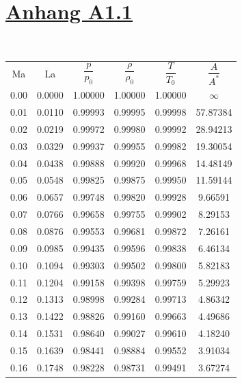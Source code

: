 \fancyfoot[C]{} %
\small

\section*{\underline{Anhang A1.1}}
\\ \vspace{4mm}%
\begin{minipage}{0.48\textwidth}
    \centering
    \begin{tabular}{c|c|c|c|c|c}
        Ma & La & $\dfrac{p}{p_0}$ & $\dfrac{\rho}{\rho_0}$ & $\dfrac{T}{T_0}$ & $\dfrac{A}{A^*}$ \\[2.2ex] \arrayrulecolor{Blue}\hline\arrayrulecolor{black}
        0.00 & 0.0000 & 1.00000 & 1.00000 & 1.00000 & $\infty$ \\
        0.01 & 0.0110 & 0.99993 & 0.99995 & 0.99998 & 57.87384 \\
        0.02 & 0.0219 & 0.99972 & 0.99980 & 0.99992 & 28.94213 \\
        0.03 & 0.0329 & 0.99937 & 0.99955 & 0.99982 & 19.30054 \\
        0.04 & 0.0438 & 0.99888 & 0.99920 & 0.99968 & 14.48149 \\
        0.05 & 0.0548 & 0.99825 & 0.99875 & 0.99950 & 11.59144 \\
        0.06 & 0.0657 & 0.99748 & 0.99820 & 0.99928 & 9.66591 \\
        0.07 & 0.0766 & 0.99658 & 0.99755 & 0.99902 & 8.29153 \\
        0.08 & 0.0876 & 0.99553 & 0.99681 & 0.99872 & 7.26161 \\
        0.09 & 0.0985 & 0.99435 & 0.99596 & 0.99838 & 6.46134 \\
        0.10 & 0.1094 & 0.99303 & 0.99502 & 0.99800 & 5.82183 \\
        0.11 & 0.1204 & 0.99158 & 0.99398 & 0.99759 & 5.29923 \\
        0.12 & 0.1313 & 0.98998 & 0.99284 & 0.99713 & 4.86342 \\
        0.13 & 0.1422 & 0.98826 & 0.99160 & 0.99663 & 4.49686 \\
        0.14 & 0.1531 & 0.98640 & 0.99027 & 0.99610 & 4.18240 \\
        0.15 & 0.1639 & 0.98441 & 0.98884 & 0.99552 & 3.91034 \\
        0.16 & 0.1748 & 0.98228 & 0.98731 & 0.99491 & 3.67274 \\

\end{tabular}
\end{minipage}
